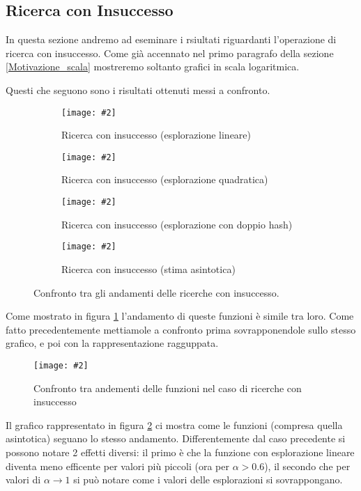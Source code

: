 \documentclass{article}
\newcommand{\image}[3][1]{
	\centering
	\texttt{[image: \#2]}
	\caption{#3}
}
\begin{document}
\subsection{Ricerca con Insuccesso}
In questa sezione andremo ad eseminare i rsiultati riguardanti l'operazione di ricerca con insuccesso. Come già accennato nel primo paragrafo della sezione \ref{Motivazione_scala} mostreremo soltanto grafici in scala logaritmica.

Questi che seguono sono i risultati ottenuti messi a confronto.
\begin{figure}[H]
\begin{subfigure}[b]{0.5\textwidth}
\image{Insuccesso_Lineare_scala_logaritmica}{Ricerca con insuccesso (esplorazione lineare)}
\end{subfigure}
\begin{subfigure}[b]{0.5\textwidth}
\image{Insuccesso_Quadratico_scala_logaritmica}{Ricerca con insuccesso (esplorazione quadratica)}
\end{subfigure}
\begin{subfigure}[b]{0.5\textwidth}
\image{Insuccesso_Doppio_scala_logaritmica}{Ricerca con insuccesso (esplorazione con doppio hash)}
\end{subfigure}
\begin{subfigure}[b]{0.5\textwidth}
\image{Insuccesso_Asintotica_scala_logaritmica}{Ricerca con insuccesso (stima asintotica)}
\end{subfigure}
\caption{Confronto tra gli andamenti delle ricerche con insuccesso.}
\label{fig:Insuccesso_quartetto}
\end{figure}

Come mostrato in figura \ref{fig:Insuccesso_quartetto} l'andamento di queste funzioni è simile tra loro. Come fatto precedentemente mettiamole a confronto prima sovrapponendole sullo stesso grafico, e poi con la rappresentazione ragguppata.  

\begin{figure}[H]
\image[0.75]{Insuccesso_Confronto_Asintotico_scala_logaritmica}{Confronto tra andementi delle funzioni nel caso di ricerche con insuccesso}
\label{fig:Insuccesso_Confronto_Asintotico_scala_logaritmica}
\end{figure}

Il grafico rappresentato in figura \ref{fig:Insuccesso_Confronto_Asintotico_scala_logaritmica} ci mostra come le funzioni (compresa quella asintotica) seguano lo stesso andamento. Differentemente dal caso precedente si possono notare 2 effetti diversi: il primo è che la funzione con esplorazione lineare diventa meno efficente per valori più piccoli (ora per $\alpha > 0.6$), il secondo che per valori di $\alpha \longrightarrow 1$ si può notare come i valori delle esplorazioni si sovrappongano.
\end{document}
